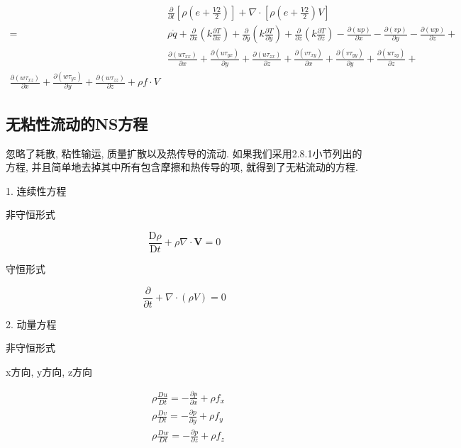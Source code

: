\documentclass[UTF8]{ctexart}
\begin{document}
$$
	\begin{aligned}
		  & \frac{\partial}{\partial t}\left[\rho\left(e+\frac{V 2}{2}\right)\right]+\nabla \cdot\left[\rho\left(e+\frac{V 2}{2}\right) V\right]                                                                                                                                                                                                     \\
		= & \rho \dot{q}+\frac{\partial}{\partial x}\left(k \frac{\partial T}{\partial x}\right)+\frac{\partial}{\partial y}\left(k \frac{\partial T}{\partial y}\right)+\frac{\partial}{\partial z}\left(k \frac{\partial T}{\partial z}\right)-\frac{\partial(u p)}{\partial x}-\frac{\partial(v p)}{\partial y}-\frac{\partial(w p)}{\partial z}+ \\
		  & \frac{\partial\left(u \tau_{x x}\right)}{\partial x}+\frac{\partial\left(u \tau_{y x}\right)}{\partial y}+\frac{\partial\left(u \tau_{z x}\right)}{\partial z}+\frac{\partial\left(v \tau_{x y}\right)}{\partial x}+\frac{\partial\left(v \tau_{y y}\right)}{\partial y}+\frac{\partial\left(u \tau_{z y}\right)}{\partial z}+           \\
		\frac{\partial\left(w \tau_{x z}\right)}{\partial x}+\frac{\partial\left(w \tau_{y z}\right)}{\partial y}+\frac{\partial\left(w \tau_{z z}\right)}{\partial z}+\rho f \cdot V
	\end{aligned}
$$

\subsection{无粘性流动的NS方程}
忽略了耗散, 粘性输运, 质量扩散以及热传导的流动. 如果我们采用2.8.1小节列出的方程, 并且简单地去掉其中所有包含摩擦和热传导的项, 就得到了无粘流动的方程.

1. 连续性方程

非守恒形式

$$
	\frac{\mathrm{D} \rho}{\mathrm{D} t}+\rho \nabla \cdot \boldsymbol{V}=0
$$

守恒形式


$$
	\frac{\partial}{\partial t}+\nabla \cdot(\rho V)=0
$$

2. 动量方程

非守恒形式

x方向, y方向, z方向

$$
	\begin{aligned}
		 & \rho \frac{D u}{D t}=-\frac{\partial p}{\partial x}+\rho f_{x} \\
		 & \rho \frac{D v}{D t}=-\frac{\partial p}{\partial y}+\rho f_{y} \\
		 & \rho \frac{D w}{D t}=-\frac{\partial p}{\partial z}+\rho f_{z}
	\end{aligned}
$$
\end{document}

